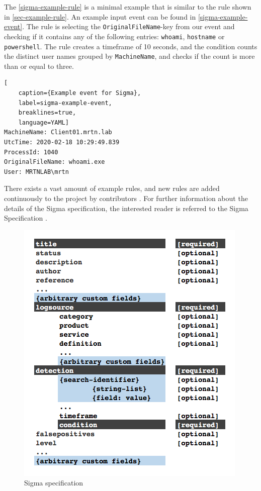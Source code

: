The \cref{sigma-example-rule} is a minimal example that is similar to the rule shown in \cref{sec-example-rule}. An example input event can be found in \cref{sigma-example-event}. The rule is selecting the \lstinline{OriginalFileName}-key from our event and checking if it contains any of the following entries: \lstinline{whoami}, \lstinline{hostname} or  \lstinline{powershell}. The rule creates a timeframe of 10 seconds, and the condition counts the distinct user names grouped by \lstinline{MachineName}, and checks if the count is more than or equal to three.

\begin{lstlisting}[
    caption={Example event for Sigma},
    label=sigma-example-event,
    breaklines=true,
    language=YAML]
MachineName: Client01.mrtn.lab
UtcTime: 2020-02-18 10:29:49.839
ProcessId: 1040
OriginalFileName: whoami.exe
User: MRTNLAB\mrtn
\end{lstlisting}

There exists a vast amount of example rules, and new rules are added continuously to the project by contributors \cite{sigmarules}. For further information about the details of the Sigma specification, the interested reader is referred to the Sigma Specification \cite{SigmaSpecification}.

\begin{figure}[htbp]  %
  \centering
  \includegraphics[scale=0.6]{figures/new-rule-format/Sigma_Schema.png}

  \caption[Sigma specification]{Sigma specification \cite{SigmaSpecification}}
  \label{fig:sigma-spec}
\end{figure}